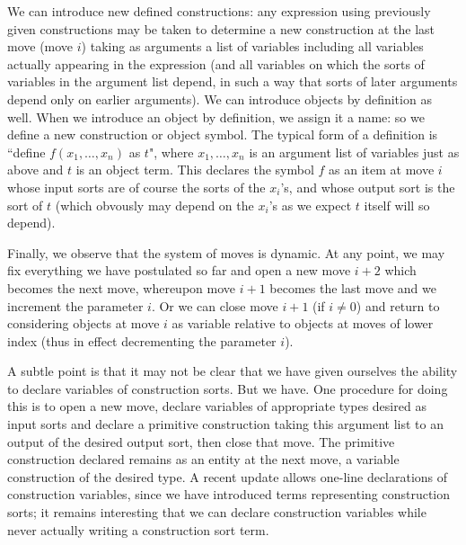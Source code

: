 \documentclass[12pt]{article}
\begin{document}
We can introduce new defined constructions:  any expression using previously given constructions may be taken to determine a new construction at the last move (move $i$) taking as arguments a list of variables including all variables actually appearing in the expression (and all variables on which the sorts of variables in the argument list depend, in such a way that sorts of later arguments depend only on earlier arguments).  We can introduce objects by definition as well.  When we introduce an object by definition, we assign it a name:  so we define a new construction or object symbol.  The typical form of a definition is ``define $f(x_1,\ldots,x_n)$ as $t$", where $x_1,\ldots,x_n$ is an argument list of variables just as above
and $t$ is an object term.  This declares the symbol $f$ as an item at move $i$ whose input sorts are of course the sorts of the $x_i$'s, and whose output sort is the sort of $t$
(which obvously may depend on the $x_i$'s as we expect $t$ itself will so depend).
  
Finally, we observe that the system of moves is dynamic.  At any point, we may fix everything we have postulated so far and open a new move $i+2$ which becomes the next move, whereupon move $i+1$ becomes the last move and we increment the parameter $i$.  Or we can close move $i+1$ (if $i \neq 0$) and return to considering objects
at move $i$ as variable relative to objects at moves of lower index (thus in effect decrementing the parameter $i$).

A subtle point is that it may not be clear that we have given ourselves the ability to declare variables of construction sorts.  But we have.  One procedure for doing this is
to open a new move, declare variables of appropriate types desired as input sorts and declare a primitive construction taking this argument list to an output of the desired output  sort, then close that move.  The primitive construction declared remains as an entity at the next move, a variable construction of the desired type.    A recent update allows one-line declarations of construction variables, since we have introduced terms representing construction sorts;  it remains interesting that we can declare construction variables while never actually writing a construction sort term.
\end{document}
